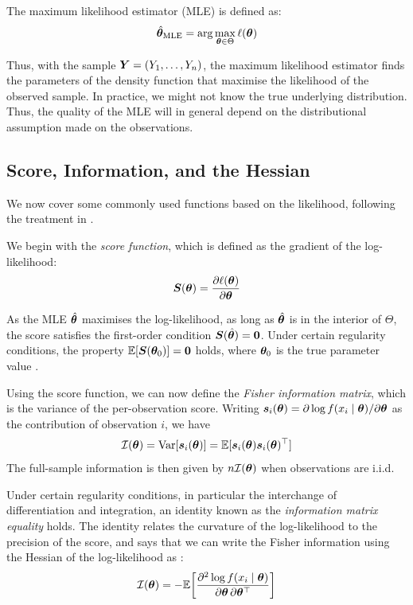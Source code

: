 The maximum likelihood estimator (MLE) is defined as:
\begin{equation}
    \hat{\bm{\theta}}_{\text{MLE}} = \arg\max_{\bm{\theta} \in \Theta} \ell(\bm{\theta})
\end{equation}

Thus, with the sample $\bm{Y} = (Y_1, \ldots, Y_n)$, the maximum likelihood estimator finds the parameters of the density function that maximise the likelihood of the observed sample. In practice, we might not know the true underlying distribution. Thus, the quality of the MLE will in general depend on the distributional assumption made on the observations.

\subsection{Score, Information, and the Hessian}

We now cover some commonly used functions based on the likelihood, following the treatment in \textcite[Sec.~7.3.2, pp.~335--338]{Casella2002}.

We begin with the \emph{score function}, which is defined as the gradient of the log-likelihood:
\begin{equation}
    \bm{S}(\bm{\theta}) = \frac{\partial \ell(\bm{\theta})}{\partial \bm{\theta}}
\end{equation}

As the MLE $\hat{\bm{\theta}}$ maximises the log-likelihood, as long as $\hat{\bm{\theta}}$ is in the interior of $\Theta$, the score satisfies the first-order condition $\bm{S}(\hat{\bm{\theta}}) = \bm{0}$. Under certain regularity conditions, the property $\mathbb{E}[\bm{S}(\bm{\theta}_0)] = \bm{0}$ holds, where $\bm{\theta}_0$ is the true parameter value \parencite[p.~336, Eq.~(7.3.8)]{Casella2002}.

Using the score function, we can now define the \emph{Fisher information matrix}, which is the variance of the per-observation score. Writing $\bm{s}_i(\bm{\theta}) = \partial \log f(x_i \mid \bm{\theta})/\partial \bm{\theta}$ as the contribution of observation $i$, we have
\begin{equation}
    \mathcal{I}(\bm{\theta}) = \operatorname{Var}[\bm{s}_i(\bm{\theta})] = \mathbb{E}[\bm{s}_i(\bm{\theta})\bm{s}_i(\bm{\theta})^\top]
\end{equation}
The full-sample information is then given by $n\mathcal{I}(\bm{\theta})$ when observations are i.i.d.

Under certain regularity conditions, in particular the interchange of differentiation and integration, an identity known as the \emph{information matrix equality} holds. The identity relates the curvature of the log-likelihood to the precision of the score, and says that we can write the Fisher information using the Hessian of the log-likelihood as \parencites[Lemma~7.3.11, p.~338]{Casella2002}[Sec.~5.5, p.~63]{vanderVaart1998}:
\begin{equation}
\label{eq:information_hessian}
    \mathcal{I}(\bm{\theta}) = -\mathbb{E}\!\left[\frac{\partial^2 \log f(x_i \mid \bm{\theta})}{\partial\bm{\theta}\,\partial\bm{\theta}^\top}\right]
\end{equation}

